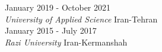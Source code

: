 
	\hfill January 2019 - October 2021 \\
\textit{University of Applied Science} 	\hfill Iran-Tehran \\

 \hfill	January 2015 - July 2017\\
\textit{Razi University } 	\hfill Iran-Kermanshah


